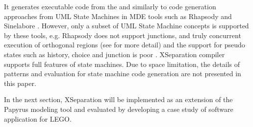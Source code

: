 \begin{figure}
\begin{minipage}{0.95\columnwidth}
	
\end{minipage} 
\end{figure}

\vskip 0.1cm
\noindent
{}
It generates executable code from the  and  similarly to code generation approaches from UML State Machines in MDE tools such as Rhapsody and Sinelabore \cite{sinelabore}.
However, only a subset of UML State Machine concepts is supported by these tools, e.g. Rhapsody does not support junctions, and truly concurrent execution of orthogonal regions
\cite{ibmdiff} (see \cite{specification_uml_2007} for more detail) and the support for pseudo states such as history, choice and junction is poor \cite{EA, sinelabore}. 
XSeparation compiler supports full features of state machines.
Due to space limitation, the details of patterns and evaluation for state machine code generation are not presented in this paper.



In the next section, XSeparation will be implemented as an extension of the Papyrus modeling tool and evaluated by developing a case study of software application for LEGO.